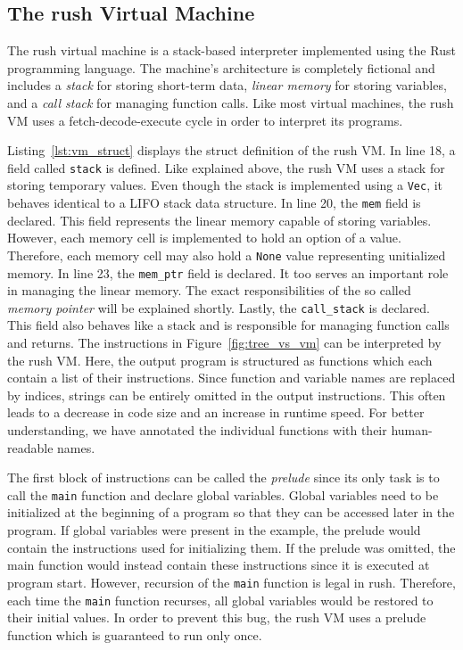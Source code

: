 \subsection{The rush Virtual Machine}

The rush virtual machine is a stack-based interpreter implemented using the Rust programming language.
The machine's architecture is completely fictional and includes a \emph{stack} for storing short-term data, \emph{linear memory} for storing variables, and a \emph{call stack} for managing function calls.
Like most virtual machines, the rush VM uses a fetch-decode-execute cycle in order to interpret its programs.


Listing~\ref{lst:vm_struct} displays the struct definition of the rush VM.
In line 18, a field called \texttt{stack} is defined.
Like explained above, the rush VM uses a stack for storing temporary values.
Even though the stack is implemented using a \texttt{Vec}, it behaves identical to a LIFO stack data structure.
In line 20, the \texttt{mem} field is declared.
This field represents the linear memory capable of storing variables.
However, each memory cell is implemented to hold an option of a value.
Therefore, each memory cell may also hold a \texttt{None} value representing unitialized memory.
In line 23, the \texttt{mem\_ptr} field is declared.
It too serves an important role in managing the linear memory.
The exact responsibilities of the so called \emph{memory pointer} will be explained shortly.
Lastly, the \texttt{call\_stack} is declared.
This field also behaves like a stack and is responsible for managing function calls and returns.
The instructions in Figure~\ref{fig:tree_vs_vm} can be interpreted by the rush VM.
Here, the output program is structured as functions which each contain a list of their instructions.
Since function and variable names are replaced by indices, strings can be entirely omitted in the output instructions.
This often leads to a decrease in code size and an increase in runtime speed.
For better understanding, we have annotated the individual functions with their human-readable names.

The first block of instructions can be called the \emph{prelude} since its only task is to call the \texttt{main} function and declare global variables.
Global variables need to be initialized at the beginning of a program so that they can be accessed later in the program.
If global variables were present in the example, the prelude would contain the instructions used for initializing them.
If the prelude was omitted, the main function would instead contain these instructions since it is executed at program start.
However, recursion of the \texttt{main} function is legal in rush.
Therefore, each time the \texttt{main} function recurses, all global variables would be restored to their initial values.
In order to prevent this bug, the rush VM uses a prelude function which is guaranteed to run only once.

